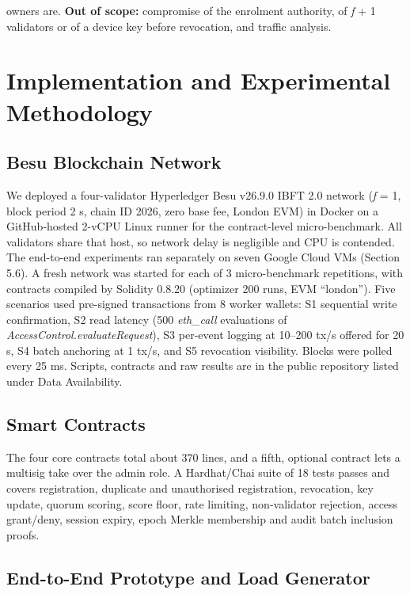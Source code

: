 \documentclass[a4paper,5p,times,twocolumn,number,sort&compress]{elsarticle}
\begin{document}
owners are. \textbf{Out of scope:} compromise of the enrolment authority, of \emph{f} + 1 validators or of a device key before revocation, and traffic analysis.

\section{Implementation and Experimental Methodology}

\subsection{Besu Blockchain Network}

We deployed a four-validator Hyperledger Besu v26.9.0 IBFT 2.0 network (\emph{f} = 1, block period 2 s, chain ID 2026, zero base fee, London EVM) in Docker on a GitHub-hosted 2-vCPU Linux runner for the contract-level micro-benchmark. All validators share that host, so network delay is negligible and CPU is contended. The end-to-end experiments ran separately on seven Google Cloud VMs (Section 5.6). A fresh network was started for each of 3 micro-benchmark repetitions, with contracts compiled by Solidity 0.8.20 (optimizer 200 runs, EVM ``london''). Five scenarios used pre-signed transactions from 8 worker wallets: S1 sequential write confirmation, S2 read latency (500 \emph{eth\_call} evaluations of \emph{AccessControl.evaluateRequest}), S3 per-event logging at 10--200 tx/s offered for 20 s, S4 batch anchoring at 1 tx/s, and S5 revocation visibility. Blocks were polled every 25 ms. Scripts, contracts and raw results are in the public repository listed under Data Availability.

\subsection{Smart Contracts}

The four core contracts total about 370 lines, and a fifth, optional contract lets a multisig take over the admin role. A Hardhat/Chai suite of 18 tests passes and covers registration, duplicate and unauthorised registration, revocation, key update, quorum scoring, score floor, rate limiting, non-validator rejection, access grant/deny, session expiry, epoch Merkle membership and audit batch inclusion proofs.

\subsection{End-to-End Prototype and Load Generator}
\end{document}
